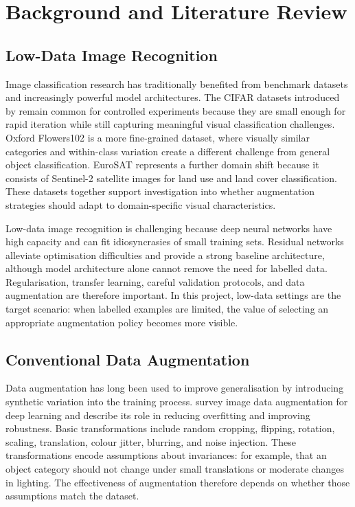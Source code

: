 \documentclass[12pt,a4paper]{report}
\begin{document}
\chapter{Background and Literature Review}

\section{Low-Data Image Recognition}

Image classification research has traditionally benefited from benchmark datasets and increasingly powerful model architectures. The CIFAR datasets introduced by \citet{krizhevsky2009learning} remain common for controlled experiments because they are small enough for rapid iteration while still capturing meaningful visual classification challenges. Oxford Flowers102 \citep{nilsback2008automated} is a more fine-grained dataset, where visually similar categories and within-class variation create a different challenge from general object classification. EuroSAT \citep{helber2019eurosat} represents a further domain shift because it consists of Sentinel-2 satellite images for land use and land cover classification. These datasets together support investigation into whether augmentation strategies should adapt to domain-specific visual characteristics.

Low-data image recognition is challenging because deep neural networks have high capacity and can fit idiosyncrasies of small training sets. Residual networks \citep{he2016deep} alleviate optimisation difficulties and provide a strong baseline architecture, although model architecture alone cannot remove the need for labelled data. Regularisation, transfer learning, careful validation protocols, and data augmentation are therefore important. In this project, low-data settings are the target scenario: when labelled examples are limited, the value of selecting an appropriate augmentation policy becomes more visible.

\section{Conventional Data Augmentation}

Data augmentation has long been used to improve generalisation by introducing synthetic variation into the training process. \citet{shorten2019survey} survey image data augmentation for deep learning and describe its role in reducing overfitting and improving robustness. Basic transformations include random cropping, flipping, rotation, scaling, translation, colour jitter, blurring, and noise injection. These transformations encode assumptions about invariances: for example, that an object category should not change under small translations or moderate changes in lighting. The effectiveness of augmentation therefore depends on whether those assumptions match the dataset.
\end{document}
